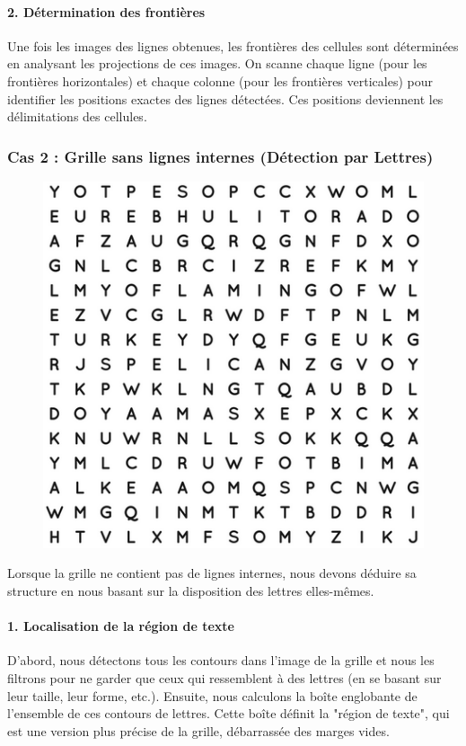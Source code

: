 \documentclass{article}
\begin{document}
\paragraph{2. Détermination des frontières}
Une fois les images des lignes obtenues, les frontières des cellules sont déterminées en analysant les projections de ces images. On scanne chaque ligne (pour les frontières horizontales) et chaque colonne (pour les frontières verticales) pour identifier les positions exactes des lignes détectées. Ces positions deviennent les délimitations des cellules.

\subsubsection{Cas 2 : Grille sans lignes internes (Détection par Lettres)}

\begin{figure}[H]
  \centering
      \includegraphics[width=\linewidth]{ressources/3step_08_text_region.png}
      \caption{}
    \endminipage\hfill
\end{figure}
Lorsque la grille ne contient pas de lignes internes, nous devons déduire sa structure en nous basant sur la disposition des lettres elles-mêmes.

\paragraph{1. Localisation de la région de texte}
D'abord, nous détectons tous les contours dans l'image de la grille et nous les filtrons pour ne garder que ceux qui ressemblent à des lettres (en se basant sur leur taille, leur forme, etc.). Ensuite, nous calculons la boîte englobante de l'ensemble de ces contours de lettres. Cette boîte définit la "région de texte", qui est une version plus précise de la grille, débarrassée des marges vides.
\end{document}

